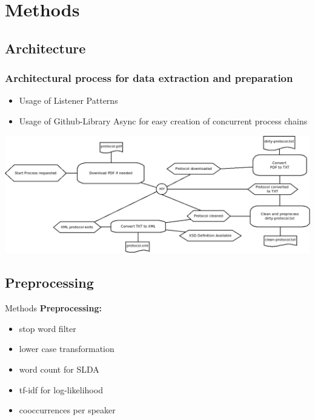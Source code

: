 \documentclass[11pt, a4paper]{beamer}
\begin{document}
\section{Methods}
\subsection{Architecture}
\begin{frame}
  \frametitle{Architectural process for data extraction and preparation}
  \begin{itemize}
  \item Usage of Listener Patterns \cite{javainsel9}
  \item Usage of Github-Library Async \cite{async} for easy creation of concurrent process chains
  \end{itemize}  
  \begin{center}
    \includegraphics[width=1\textwidth]{process-overview.png}
  \end{center}
\end{frame}

\subsection{Preprocessing}
\begin{frame}{Methods}
\textbf{Preprocessing:}
\begin{itemize}
\item stop word filter
\item lower case transformation
\item word count for SLDA
\item tf-idf for log-likelihood
\item cooccurrences per speaker
\end{itemize}
\end{frame}
\end{document}
